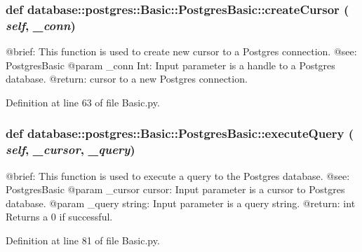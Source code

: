 \hypertarget{classdatabase_1_1postgres_1_1Basic_1_1PostgresBasic_a8a483c39885798b1f233f90373010986}{
\subsubsection[{createCursor}]{\setlength{\rightskip}{0pt plus 5cm}def database::postgres::Basic::PostgresBasic::createCursor ( {\em self}, \/   {\em \_\-conn})}}
\label{classdatabase_1_1postgres_1_1Basic_1_1PostgresBasic_a8a483c39885798b1f233f90373010986}
\begin{DoxyVerb}
@brief: This function is used to create new cursor to a Postgres connection.
@see: PostgresBasic
@param _conn Int: Input parameter is a handle to a Postgres database.
@return: cursor to a new Postgres connection. 
\end{DoxyVerb}
 

Definition at line 63 of file Basic.py.

\hypertarget{classdatabase_1_1postgres_1_1Basic_1_1PostgresBasic_ac0921c1b31b0e241415cd9dfc3f20386}{
\subsubsection[{executeQuery}]{\setlength{\rightskip}{0pt plus 5cm}def database::postgres::Basic::PostgresBasic::executeQuery ( {\em self}, \/   {\em \_\-cursor}, \/   {\em \_\-query})}}
\label{classdatabase_1_1postgres_1_1Basic_1_1PostgresBasic_ac0921c1b31b0e241415cd9dfc3f20386}
\begin{DoxyVerb}
@brief: This function is used to execute a query to the Postgres database.
@see: PostgresBasic
@param _cursor cursor: Input parameter is a cursor to Postgres database.
@param _query string: Input parameter is a query string.
@return: int Returns a 0 if successful.
\end{DoxyVerb}
 

Definition at line 81 of file Basic.py.



